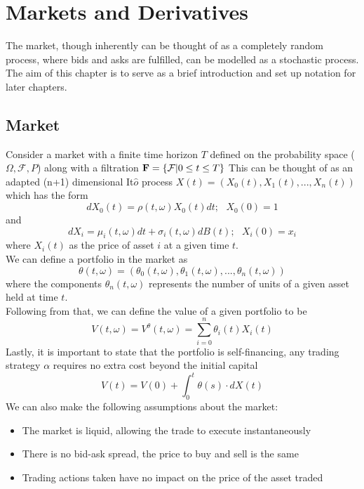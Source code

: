 \documentclass[12pt]{article}
\numberwithin{equation}{section}
\begin{document}
\clearpage
\section{Markets and Derivatives}
The market, though inherently can be thought of as a completely random process,
where bids and asks are fulfilled, can be modelled as a stochastic process. The 
aim of this chapter is to serve as a brief introduction and set up notation for 
later chapters. \\
\subsection{Market}
Consider a market with a finite time horizon $T$ defined on the probability space 
($\Omega,\mathcal{F},P$) along with a filtration $\bold{F} = \{\mathcal{F}| 0 \leq t \leq T \}$ 
This can be thought of as an adapted (n+1) dimensional It$\hat{o}$ process 
$X(t) = (X_0(t), X_1(t),...,X_n(t))$
which has the form 
\begin{equation}
dX_0(t) = \rho(t,\omega)X_0(t)dt;\hspace{8pt}X_0(0)=1
\end{equation}and
\begin{equation}
dX_i = \mu_i(t,\omega)dt+\sigma_i(t,\omega)dB(t);\hspace{8pt}X_i(0)=x_i 
\end{equation}
where $X_i(t)$ as the price of asset $i$ at a given time $t$.
\\
We can define a portfolio in the market as 
\begin{equation}
\theta(t,\omega) = (\theta_0(t,\omega),\theta_1(t,\omega),...,\theta_n(t,\omega))
\end{equation}
where the components $\theta_n(t,\omega)$ represents the number of units of a given 
asset held at time $t$.\\
Following from that, we can define the value of a given portfolio to be 
\begin{equation}
  V(t,\omega) = V^{\theta}(t,\omega) = \sum_{i=0}^n \theta_i(t)X_i(t)
\end{equation}
Lastly, it is important to state that the portfolio is self-financing, any 
trading strategy $\alpha$ requires no extra cost beyond the initial capital
\begin{equation}
  V(t) = V(0) + \int_0^t\theta(s)\cdot dX(t)
\end{equation}
We can also make the following assumptions about the market:
\begin{itemize}
  \item The market is liquid, allowing the trade to execute instantaneously
  \item There is no bid-ask spread, the price to buy and sell is the same 
  \item Trading actions taken have no impact on the price of the asset traded 
\end{itemize}
\end{document}
